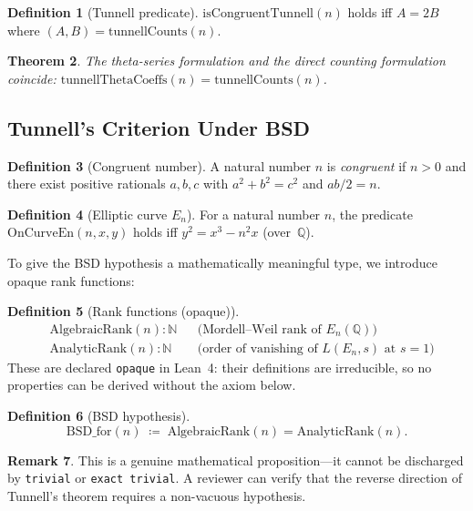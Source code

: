 \documentclass[11pt,a4paper]{article}
\newtheorem{theorem}{Theorem}[section]
\theoremstyle{definition}
\newtheorem{definition}[theorem]{Definition}
\newtheorem{remark}[theorem]{Remark}
\newcommand{\Q}{\mathbb{Q}}
\newcommand{\N}{\mathbb{N}}
\newcommand{\lean}[1]{\texttt{#1}}
\newcommand{\BSDfor}{\mathrm{BSD\_for}}
\newcommand{\En}{E_n}
\begin{document}
\begin{definition}[Tunnell predicate]\label{def:tunnell-pred}
$\mathrm{isCongruentTunnell}(n)$ holds iff $A = 2B$ where
$(A, B) = \mathrm{tunnellCounts}(n)$.
\end{definition}

\begin{theorem}\label{thm:theta-tunnell}
The theta-series formulation and the direct counting formulation
coincide: $\mathrm{tunnellThetaCoeffs}(n) = \mathrm{tunnellCounts}(n)$.
\end{theorem}

\subsection{Tunnell's Criterion Under BSD}\label{sec:s6}

\begin{definition}[Congruent number]
A natural number $n$ is \emph{congruent} if $n > 0$ and there exist
positive rationals $a, b, c$ with $a^2 + b^2 = c^2$ and
$ab/2 = n$.
\end{definition}

\begin{definition}[Elliptic curve $\En$]
For a natural number $n$, the predicate $\mathrm{OnCurveEn}(n,x,y)$
holds iff $y^2 = x^3 - n^2 x$ (over~$\Q$).
\end{definition}

To give the BSD hypothesis a mathematically meaningful type, we
introduce opaque rank functions:

\begin{definition}[Rank functions (opaque)]
\begin{align*}
  &\mathrm{AlgebraicRank}(n) : \N && \text{(Mordell--Weil rank of $\En(\Q)$)}\\
  &\mathrm{AnalyticRank}(n) : \N && \text{(order of vanishing of $L(\En,s)$ at $s=1$)}
\end{align*}
These are declared \lean{opaque} in Lean~4: their definitions are
irreducible, so no properties can be derived without the axiom below.
\end{definition}

\begin{definition}[BSD hypothesis]
\[
  \BSDfor(n) \;\coloneqq\;
  \mathrm{AlgebraicRank}(n) = \mathrm{AnalyticRank}(n).
\]
\end{definition}

\begin{remark}
This is a genuine mathematical proposition---it cannot be discharged
by \lean{trivial} or \lean{exact trivial}.  A reviewer can verify
that the reverse direction of Tunnell's theorem requires a
non-vacuous hypothesis.
\end{remark}
\end{document}
